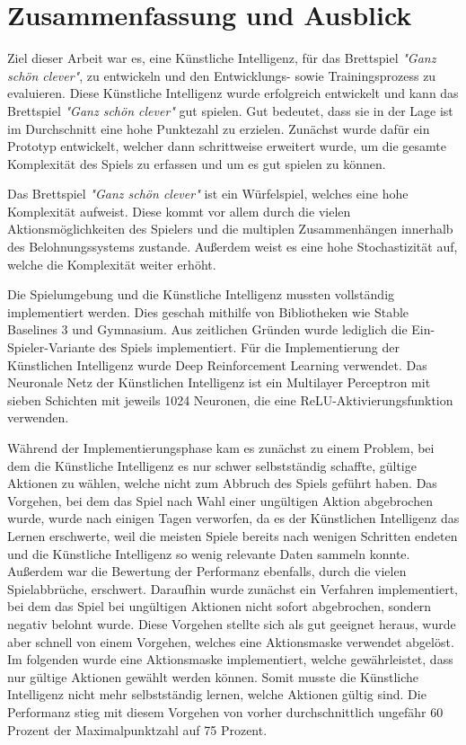 \section{Zusammenfassung und Ausblick}
Ziel dieser Arbeit war es, eine Künstliche Intelligenz, für das Brettspiel \textit{"Ganz schön clever"}, zu entwickeln und den Entwicklungs- sowie Trainingsprozess zu evaluieren.
Diese Künstliche Intelligenz wurde erfolgreich entwickelt und kann das Brettspiel \textit{"Ganz schön clever"} gut spielen. Gut bedeutet, dass sie in der Lage ist im Durchschnitt eine hohe Punktezahl zu erzielen. Zunächst wurde dafür ein Prototyp entwickelt, welcher dann schrittweise erweitert wurde, um die gesamte Komplexität des Spiels zu erfassen und um es gut spielen zu können.

Das Brettspiel \textit{"Ganz schön clever"} ist ein Würfelspiel, welches eine hohe Komplexität aufweist. Diese kommt vor allem durch die vielen Aktionsmöglichkeiten des Spielers und die multiplen Zusammenhängen innerhalb des Belohnungssystems zustande. Außerdem weist es eine hohe Stochastizität auf, welche die Komplexität weiter erhöht.


Die Spielumgebung und die Künstliche Intelligenz mussten vollständig implementiert werden. Dies geschah mithilfe von Bibliotheken wie Stable Baselines 3 und Gymnasium. Aus zeitlichen Gründen wurde lediglich die Ein-Spieler-Variante des Spiels implementiert. Für die Implementierung der Künstlichen Intelligenz wurde Deep Reinforcement Learning verwendet. Das Neuronale Netz der Künstlichen Intelligenz ist ein Multilayer Perceptron mit sieben Schichten mit jeweils 1024 Neuronen, die eine ReLU-Aktivierungsfunktion verwenden.

Während der Implementierungsphase kam es zunächst zu einem Problem, bei dem die Künstliche Intelligenz es nur schwer selbstständig schaffte, gültige Aktionen zu wählen, welche nicht zum Abbruch des Spiels geführt haben. Das Vorgehen, bei dem das Spiel nach Wahl einer ungültigen Aktion abgebrochen wurde, wurde nach einigen Tagen verworfen, da es der Künstlichen Intelligenz das Lernen erschwerte, weil die meisten Spiele bereits nach wenigen Schritten endeten und die Künstliche Intelligenz so wenig relevante Daten sammeln konnte. Außerdem war die Bewertung der Performanz ebenfalls, durch die vielen Spielabbrüche, erschwert. Daraufhin wurde zunächst ein Verfahren implementiert, bei dem das Spiel bei ungültigen Aktionen nicht sofort abgebrochen, sondern negativ belohnt wurde. Diese Vorgehen stellte sich als gut geeignet heraus, wurde aber schnell von einem Vorgehen, welches eine Aktionsmaske verwendet abgelöst. Im folgenden wurde eine Aktionsmaske implementiert, welche gewährleistet, dass nur gültige Aktionen gewählt werden können. Somit musste die Künstliche Intelligenz nicht mehr selbstständig lernen, welche Aktionen gültig sind. Die Performanz stieg mit diesem Vorgehen von vorher durchschnittlich ungefähr 60 Prozent der Maximalpunktzahl auf 75 Prozent.

